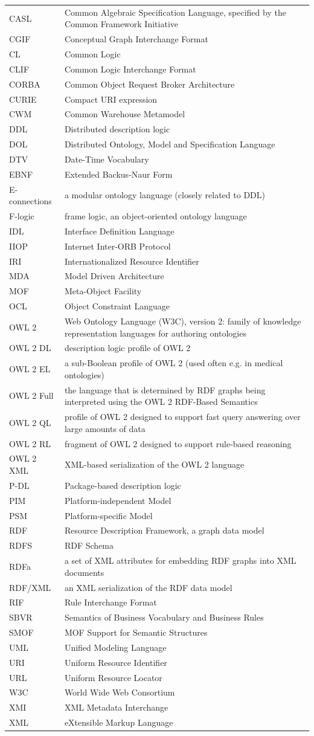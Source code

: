\documentclass[10pt,fleqn,%
\ifpretendfinal
final%
\else
draft%
\fi,
]{scrreprt}
\makeatletter
\newcommand*{\eg}{e.g.\@\xspace}
\newenvironment{symbols}[0]{\begin{longtable}{p{.15\textwidth}p{.84\textwidth}}}{\end{longtable}}
\newcommand{\symboldef}[2]{ #1 & #2 \\}
\makeatother
\begin{document}
\begin{symbols}
\symboldef{CASL}{Common Algebraic Specification Language, specified by the Common Framework Initiative}
\symboldef{CGIF}{Conceptual Graph Interchange Format}
\symboldef{CL}{Common Logic }
\symboldef{CLIF}{Common Logic Interchange Format}
\symboldef{CORBA}{Common Object Request Broker Architecture}
\symboldef{CURIE}{Compact URI expression}
\symboldef{CWM}{Common Warehouse Metamodel}
\symboldef{DDL}{Distributed description logic}
\symboldef{DOL}{Distributed Ontology, Model and Specification Language}
\symboldef{DTV}{Date-Time Vocabulary}
\symboldef{EBNF}{Extended Backus-Naur Form}
\symboldef{E-connections}{a modular ontology language (closely related to DDL)}
\symboldef{F-logic}{frame logic, an object-oriented ontology language}
\symboldef{IDL}{Interface Definition Language}
\symboldef{IIOP}{Internet Inter-ORB Protocol}
\symboldef{IRI}{Internationalized Resource Identifier}
\symboldef{MDA}{Model Driven Architecture}
\symboldef{MOF}{Meta-Object Facility}
\symboldef{OCL}{Object Constraint Language}
\symboldef{OWL 2}{Web Ontology Language (W3C), version 2: family of knowledge representation languages for authoring ontologies}
\symboldef{OWL 2 DL}{description logic profile of OWL 2}
\symboldef{OWL 2 EL}{a sub-Boolean profile of OWL 2 (used often \eg in medical ontologies)}
\symboldef{OWL 2 Full}{the language that is determined by RDF graphs being interpreted 
using the OWL 2 RDF-Based Semantics \cite{W3C:REC-owl2-rdf-based-semantics-20091027}}
\symboldef{OWL 2 QL}{profile of OWL 2 designed to support fast query answering over large amounts of data}
\symboldef{OWL 2 RL}{fragment of OWL 2 designed to support rule-based reasoning}
\symboldef{OWL 2 XML}{XML-based serialization of the OWL 2 language}
\symboldef{P-DL}{Package-based description logic}
\symboldef{PIM}{Platform-independent Model}
\symboldef{PSM}{Platform-specific Model}
\symboldef{RDF}{Resource Description Framework, a graph data model}
\symboldef{RDFS}{RDF Schema}
\symboldef{RDFa}{a set of XML attributes for embedding RDF graphs into XML documents}
\symboldef{RDF/XML}{an XML serialization of the RDF data model}
\symboldef{RIF}{Rule Interchange Format}
\symboldef{SBVR}{Semantics of Business Vocabulary and Business Rules}
\symboldef{SMOF}{MOF Support for Semantic Structures}
\symboldef{UML}{Unified Modeling Language}
\symboldef{URI}{Uniform Resource Identifier}
\symboldef{URL}{Uniform Resource Locator}
\symboldef{W3C}{World Wide Web Consortium}
\symboldef{XMI}{XML Metadata Interchange}
\symboldef{XML}{eXtensible Markup Language}
\end{symbols}
\end{document}
